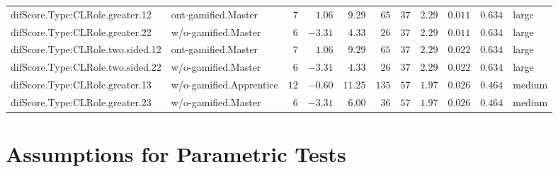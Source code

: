 \documentclass[6pt,a4paper]{article}
\begin{document}
\begin{landscape}
{\begin{longtable}{llrrrrrrrrl}
difScore.Type:CLRole.greater.12&ont-gamified.Master&$ 7$&$ 1.06$&$ 9.29$&$ 65$&$ 37$&$2.29$&$0.011$&$0.634$&large\tabularnewline
difScore.Type:CLRole.greater.22&w/o-gamified.Master&$ 6$&$-3.31$&$ 4.33$&$ 26$&$ 37$&$2.29$&$0.011$&$0.634$&large\tabularnewline
difScore.Type:CLRole.two.sided.12&ont-gamified.Master&$ 7$&$ 1.06$&$ 9.29$&$ 65$&$ 37$&$2.29$&$0.022$&$0.634$&large\tabularnewline
difScore.Type:CLRole.two.sided.22&w/o-gamified.Master&$ 6$&$-3.31$&$ 4.33$&$ 26$&$ 37$&$2.29$&$0.022$&$0.634$&large\tabularnewline
difScore.Type:CLRole.greater.13&w/o-gamified.Apprentice&$12$&$-0.60$&$11.25$&$135$&$ 57$&$1.97$&$0.026$&$0.464$&medium\tabularnewline
difScore.Type:CLRole.greater.23&w/o-gamified.Master&$ 6$&$-3.31$&$ 6.00$&$ 36$&$ 57$&$1.97$&$0.026$&$0.464$&medium\tabularnewline
\hline
\end{longtable}}

\end{landscape}

\section{Assumptions for Parametric Tests}
\end{document}

